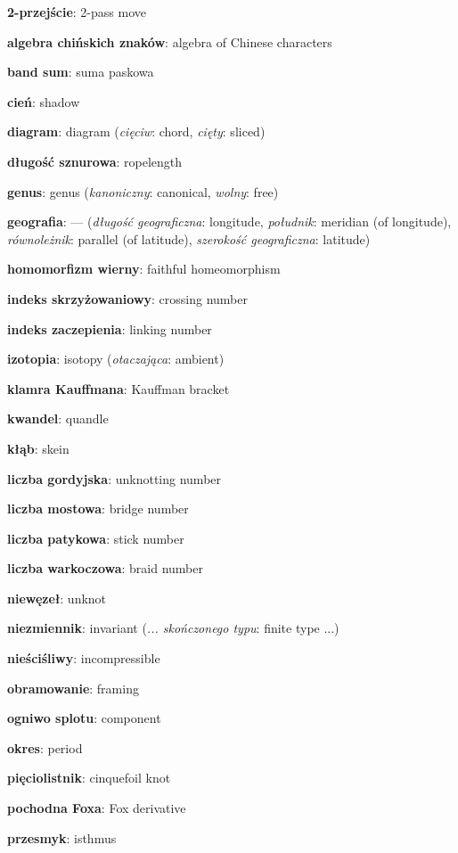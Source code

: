 \item \textbf{2-przejście}: 2-pass move
\item \textbf{algebra chińskich znaków}: algebra of Chinese characters
\item \textbf{band sum}: suma paskowa
\item \textbf{cień}: shadow
\item \textbf{diagram}: diagram
(\emph{cięciw}: chord, \emph{cięty}: sliced)
\item \textbf{długość sznurowa}: ropelength
\item \textbf{genus}: genus
(\emph{kanoniczny}: canonical, \emph{wolny}: free)
\item \textbf{geografia}: ---
(\emph{długość geograficzna}: longitude, \emph{południk}: meridian (of longitude), \emph{równoleżnik}: parallel (of latitude), \emph{szerokość geograficzna}: latitude)
\item \textbf{homomorfizm wierny}: faithful homeomorphism
\item \textbf{indeks skrzyżowaniowy}: crossing number
\item \textbf{indeks zaczepienia}: linking number
\item \textbf{izotopia}: isotopy
(\emph{otaczająca}: ambient)
\item \textbf{klamra Kauffmana}: Kauffman bracket
\item \textbf{kwandel}: quandle
\item \textbf{kłąb}: skein
\item \textbf{liczba gordyjska}: unknotting number
\item \textbf{liczba mostowa}: bridge number
\item \textbf{liczba patykowa}: stick number
\item \textbf{liczba warkoczowa}: braid number
\item \textbf{niewęzeł}: unknot
\item \textbf{niezmiennik}: invariant
(\emph{... skończonego typu}: finite type ...)
\item \textbf{nieściśliwy}: incompressible
\item \textbf{obramowanie}: framing
\item \textbf{ogniwo splotu}: component
\item \textbf{okres}: period
\item \textbf{pięciolistnik}: cinquefoil knot
\item \textbf{pochodna Foxa}: Fox derivative
\item \textbf{przesmyk}: isthmus
